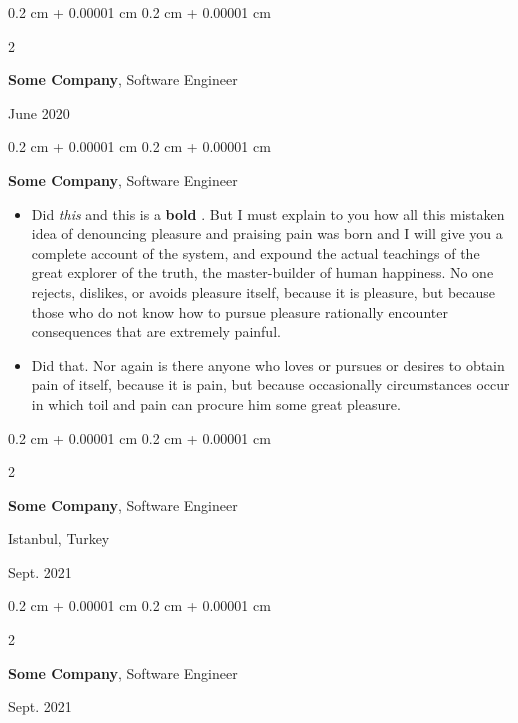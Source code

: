 \documentclass[10pt, letterpaper]{article}
\newenvironment{highlights}{
    \begin{itemize}[
        topsep=0.10 cm,
        parsep=0.10 cm,
        partopsep=0pt,
        itemsep=0pt,
        leftmargin=0.4 cm + 10pt
    ]
}{
    \end{itemize}
} %
\newenvironment{onecolentry}{
    \begin{adjustwidth}{
        0.2 cm + 0.00001 cm
    }{
        0.2 cm + 0.00001 cm
    }
}{
    \end{adjustwidth}
} %
\newenvironment{twocolentry}[2][]{
    \onecolentry
    \def\secondColumn{#2}
    \setcolumnwidth{\fill, 4.5 cm}
    \begin{paracol}{2}
}{
    \switchcolumn \raggedleft \secondColumn
    \end{paracol}
    \endonecolentry
} %
\let\hrefWithoutArrow\href
\renewcommand{\href}[2]{\hrefWithoutArrow{#1}{\mbox{\ifthenelse{\equal{#2}{}}{ }{#2 }\raisebox{.15ex}{\footnotesize \faExternalLink*}}}}
\begin{document}
        \vspace{0.2 cm}

        \begin{twocolentry}{
            June 2020
        }
            \textbf{Some \textnormal{Company}}, Software Engineer
        \end{twocolentry}


        \vspace{0.2 cm}

        \begin{onecolentry}
            \textbf{Some \textnormal{Company}}, Software Engineer
            \begin{highlights}
                \item Did \textit{this} and this is a \textbf{bold} \href{https://example.com}{link}. But I must explain to you how all this mistaken idea of denouncing pleasure and praising pain was born and I will give you a complete account of the system, and expound the actual teachings of the great explorer of the truth, the master-builder of human happiness. No one rejects, dislikes, or avoids pleasure itself, because it is pleasure, but because those who do not know how to pursue pleasure rationally encounter consequences that are extremely painful.
                \item Did that. Nor again is there anyone who loves or pursues or desires to obtain pain of itself, because it is pain, but because occasionally circumstances occur in which toil and pain can procure him some great pleasure.
            \end{highlights}
        \end{onecolentry}


        \vspace{0.2 cm}

        \begin{twocolentry}{
            Istanbul, Turkey

        Sept. 2021
        }
            \textbf{Some \textnormal{Company}}, Software Engineer
        \end{twocolentry}


        \vspace{0.2 cm}

        \begin{twocolentry}{
            Sept. 2021
        }
            \textbf{Some \textnormal{Company}}, Software Engineer
        \end{twocolentry}


        \vspace{0.2 cm}
\end{document}
